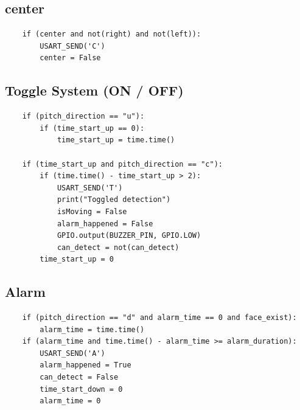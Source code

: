 \subsection{center}
\begin{verbatim}
    if (center and not(right) and not(left)):
        USART_SEND('C')
        center = False
\end{verbatim}

\subsection{Toggle System (ON / OFF)}
\begin{verbatim}
    if (pitch_direction == "u"):
        if (time_start_up == 0):
            time_start_up = time.time()
             
    if (time_start_up and pitch_direction == "c"):
        if (time.time() - time_start_up > 2):
            USART_SEND('T')
            print("Toggled detection")
            isMoving = False
            alarm_happened = False
            GPIO.output(BUZZER_PIN, GPIO.LOW)
            can_detect = not(can_detect)
        time_start_up = 0
\end{verbatim}

\subsection{Alarm}
\begin{verbatim}
    if (pitch_direction == "d" and alarm_time == 0 and face_exist):
        alarm_time = time.time()
    if (alarm_time and time.time() - alarm_time >= alarm_duration):
        USART_SEND('A')
        alarm_happened = True
        can_detect = False
        time_start_down = 0
        alarm_time = 0
\end{verbatim}